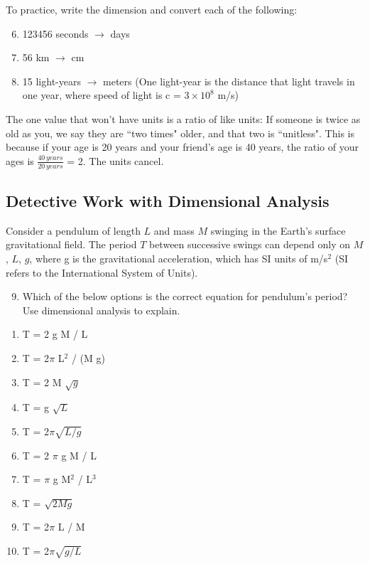 \documentclass[12pt]{article}
\begin{document}
To practice, write the dimension and convert each of the following:

\begin{enumerate}
\setcounter{enumi}{5}
\item{123456 seconds $\rightarrow$ days}
\item{56 km $\rightarrow$ cm}
\item{15 light-years $\rightarrow$ meters (One light-year is the distance that light travels in one year, where speed of light is c = $3 \times 10^{8}$ m/s)}
\end{enumerate}

The one value that won't have units is a ratio of like units:
If someone is twice as old as you, we say they are ``two times" older, and
that two is ``unitless". This is because if your age is 20 years and your friend's age is 40 years, the ratio of your ages is $\frac{40 \,years}{20 \,years}$ = 2. The units cancel.

\subsection*{Detective Work with Dimensional Analysis}

Consider a pendulum of length $L$ and mass $M$ swinging in the Earth's
surface gravitational field.
The period $T$ between successive swings can depend only on $M$, $L$, $g$, where g is the gravitational acceleration, which has SI units of m/s$^2$ (SI refers to the International System of Units). 

\begin{enumerate}
\setcounter{enumi}{8}
    \item Which of the below options is the correct equation for pendulum's period? Use dimensional analysis to
explain.
\end{enumerate}

\begin{multicols}{2}
\begin{enumerate}[label={\alph*.}, leftmargin=3\parindent]

\item{ T = 2 g M / L}
\item{  T = 2$\pi$ L$^2$ / (M g)}
\item{  T = 2 M $\sqrt{g}$ }
\item{  T = g $\sqrt{L}$ }
\item{  T = 2$\pi \sqrt{L / g}$}

\item{ T = 2 $\pi$ g M / L }
\item{  T = $\pi$ g M$^2$ / L$^3$}
\item{  T = $\sqrt{2 M g}$ }
\item{  T = 2$\pi$ L / M }
\item{  T = 2$\pi \sqrt{g / L}$}

\end{enumerate}
\end{multicols}
\end{document}
